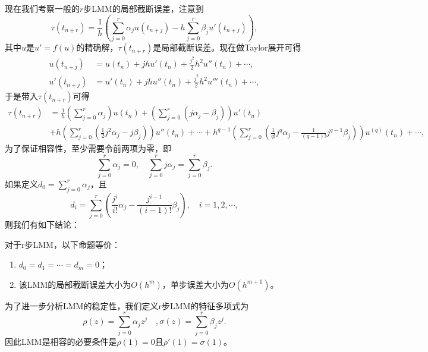 \documentclass[a4paper,10pt]{ctexart}
\begin{document}
现在我们考察一般的$ r $步LMM的局部截断误差，注意到
\[
    \tau(t_{n+r}) = \frac{1}{h} \left( \sum_{j=0}^r \alpha_j u(t_{n+j}) - h\sum_{j=0}^r \beta_j u'(t_{n+j}) \right) ,
\]
其中$ u $是$ u'=f(u) $的精确解，$ \tau(t_{n+r}) $是局部截断误差。现在做Taylor展开可得
\[
    \begin{aligned}
        u(t_{n+j}) &= u(t_n) + jh u'(t_n) + \frac{j^2}{2}h^2 u''(t_n) + \cdots,\\
        u'(t_{n+j}) &= u'(t_n) + jh u''(t_n) + \frac{j^2}{2}h^2 u'''(t_n) + \cdots,
    \end{aligned}
\]
于是带入$ \tau(t_{n+r}) $可得
\[
    \begin{aligned}
        \tau(t_{n+r}) 
        &= \frac{1}{h} \left( \sum_{j=0}^r \alpha_j \right) u(t_n) + \left( \sum_{j=0}^r (j \alpha_j - \beta_j) \right) u'(t_n)\\
        & + h \left( \sum_{j=0}^r (\frac{1}{2}j^2 \alpha_j-j \beta_j) \right) u''(t_n) + \cdots + h^{q-1} \left( \sum_{j=0}^r (\frac{1}{q!}j^{q} \alpha_j-\frac{1}{(q-1)!}j^{q-1} \beta_j) \right) u^{(q)}(t_n) + \cdots,
    \end{aligned}
\]
为了保证相容性，至少需要令前两项为零，即
\[
    \sum_{j=0}^r \alpha_j = 0,\quad \sum_{j=0}^r j \alpha_j = \sum_{j=0}^r \beta_j.
\]
如果定义$ d_0 = \sum_{j=0}^r \alpha_j $，且
\begin{equation}
    d_i = \sum_{j=0}^r (\frac{j^i}{i!} \alpha_j - \frac{j^{i-1}}{(i-1)!}\beta_j),\quad i=1,2,\cdots,
\end{equation}
则我们有如下结论：
\begin{theorem}
    对于r步LMM，以下命题等价：
    \begin{enumerate}
        \item $ d_0 = d_1 = \cdots = d_m = 0 $；
        \item 该LMM的局部截断误差大小为$ O(h^{m}) $，单步误差大小为$ O(h^{m+1}) $。
    \end{enumerate}
\end{theorem}

为了进一步分析LMM的稳定性，我们定义r步LMM的特征多项式为
\begin{equation}
    \rho(z) = \sum_{j=0}^r \alpha_j z^j\quad, \sigma(z) =\sum_{j=0}^r \beta_j z^j.
\end{equation}
因此LMM是相容的必要条件是$ \rho(1)=0 $且$ \rho'(1) = \sigma(1) $。
\end{document}
